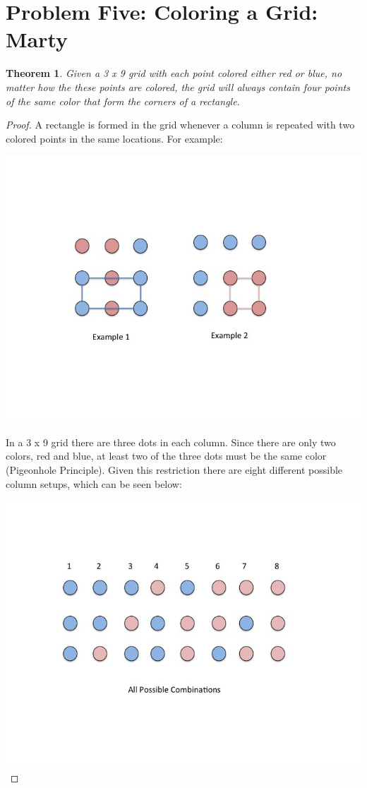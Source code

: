 \documentclass[10pt,letter]{article}
\newtheorem*{thm}{Theorem}
\begin{document}
\section*{Problem Five: Coloring a Grid: Marty}
\begin{thm} Given a 3 x 9 grid with each point colored either red or blue, no matter how the these points are colored, the grid will always contain four points of the same color that form the corners of a rectangle. 
\end{thm}
\begin{proof}
A rectangle is formed in the grid whenever a column is repeated with two colored points in the same locations. For example: \\
\begin{minipage}{.8\textwidth}
\includegraphics[width=.8\linewidth]{Slide1.jpg}
\end{minipage}

In a 3 x 9 grid there are three dots in each column. Since there are only two colors, red and blue, at least two of the three dots must be the same color (Pigeonhole Principle). Given this restriction there are eight different possible column setups, which can be seen below:

\begin{minipage}{.8\textwidth}
\includegraphics[width=.8\linewidth]{Slide2.jpg}
\end{minipage}


\end{proof}
\end{document}
